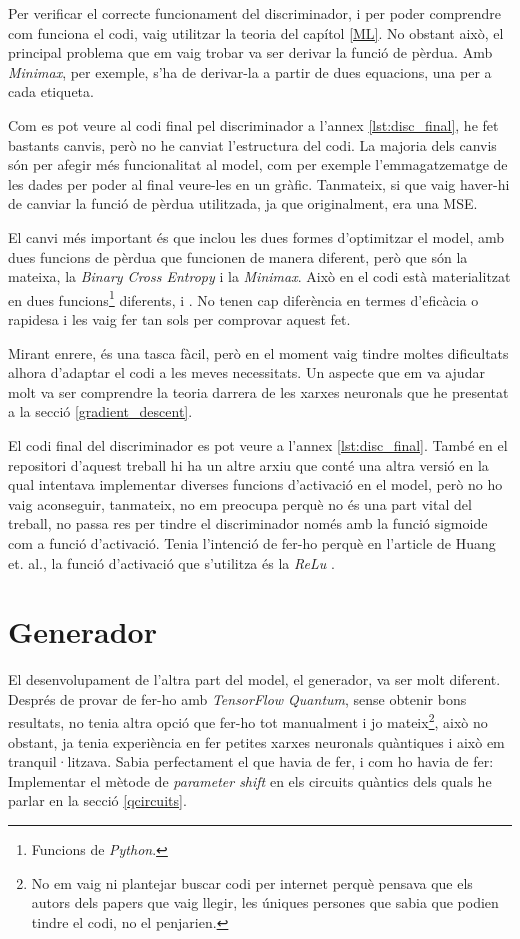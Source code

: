 Per verificar el correcte funcionament del discriminador, i per poder comprendre com funciona el codi, vaig utilitzar la teoria del capítol \ref{ML}. No obstant això, el principal problema que em vaig trobar va ser derivar la funció de pèrdua. Amb \textit{Minimax}, per exemple, s'ha de derivar-la a partir de dues equacions, una per a cada etiqueta.

Com es pot veure al codi final pel discriminador a l'annex \ref{lst:disc_final}, he fet bastants canvis, però no he canviat l'estructura del codi. La majoria dels canvis són per afegir més funcionalitat al model, com per exemple l'emmagatzematge de les dades per poder al final veure-les en un gràfic. Tanmateix, si que vaig haver-hi de canviar la funció de pèrdua utilitzada, ja que originalment, era una MSE.

El canvi més important és que inclou les dues formes d'optimitzar el model, amb dues funcions de pèrdua que funcionen de manera diferent, però que són la mateixa, la \textit{Binary Cross Entropy} i la \textit{Minimax}. Això en el codi està materialitzat en dues funcions\footnote{Funcions de \textit{Python}.} diferents,  i . No tenen cap diferència en termes d'eficàcia o rapidesa i les vaig fer tan sols per comprovar aquest fet. 

Mirant enrere, és una tasca fàcil, però en el moment vaig tindre moltes dificultats alhora d'adaptar el codi a les meves necessitats. Un aspecte que em va ajudar molt va ser comprendre la teoria darrera de les xarxes neuronals que he presentat a la secció \ref{gradient_descent}.

El codi final del discriminador es pot veure a l'annex \ref{lst:disc_final}. També en el repositori d'aquest treball hi ha un altre arxiu que conté una altra versió en la qual intentava implementar diverses funcions d'activació en el model, però no ho vaig aconseguir, tanmateix, no em preocupa perquè no és una part vital del treball, no passa res per tindre el discriminador només amb la funció sigmoide com a funció d'activació. Tenia l'intenció de fer-ho perquè en l'article de Huang et. al., la funció d'activació que s'utilitza és la \textit{ReLu} \cite{QGAN_exp}. 

\section{Generador}

El desenvolupament de l'altra part del model, el generador, va ser molt diferent. Després de provar de fer-ho amb \textit{TensorFlow Quantum}, sense obtenir bons resultats, no tenia altra opció que fer-ho tot manualment i jo mateix\footnote{No em vaig ni plantejar buscar codi per internet perquè pensava que els autors dels papers que vaig llegir, les úniques persones que sabia que podien tindre el codi, no el penjarien.}, això no obstant, ja tenia experiència en fer petites xarxes neuronals quàntiques i això em tranquil·litzava. Sabia perfectament el que havia de fer, i com ho havia de fer: Implementar el mètode de \textit{parameter shift} en els circuits quàntics dels quals he parlar en la secció \ref{qcircuits}.

